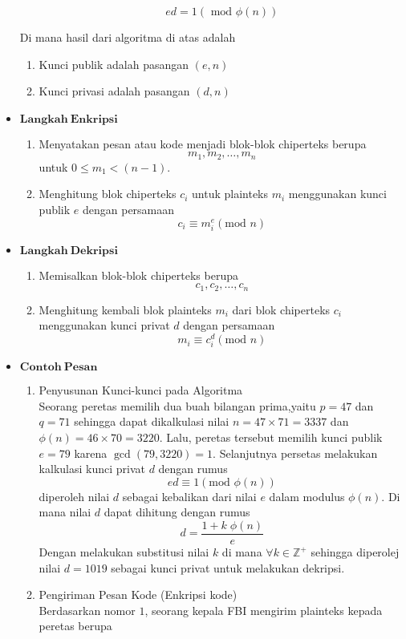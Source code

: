 \documentclass[12pt,A4paper]{article}
\begin{document}
\begin{itemize}
\begin{enumerate}
		\[ed = 1 \left(\text{ mod } \phi(n)\right) \]
	\end{enumerate}
	Di mana hasil dari algoritma di atas adalah
	\begin{enumerate}
		\item Kunci publik adalah pasangan $(e, n)$
		\item Kunci privasi adalah pasangan $(d, n)$
	\end{enumerate}
\newpage
	\item $\mathbf{Langkah \: Enkripsi}$
	\begin{enumerate}
		\item Menyatakan pesan atau kode menjadi blok-blok chiperteks berupa
		\[m_1, m_2, \dots , m_n\]
		untuk $0 \leq m_1 < (n-1)$.
		\item Menghitung blok chiperteks $c_i$ untuk plainteks $m_i$ menggunakan kunci publik $e$ dengan persamaan
		\[c_i \equiv m_i^e (\text{mod }n)\]
	\end{enumerate}
	\item $\mathbf{Langkah \: Dekripsi}$
	\begin{enumerate}
		\item Memisalkan blok-blok chiperteks berupa
		\[c_1,c_2, \dots, c_n\]
		\item Menghitung kembali blok plainteks $m_i$ dari blok chiperteks $c_i$ menggunakan kunci privat $d$ dengan persamaan
		\[m_i \equiv c_i^d (\text{mod } n)\]
	\end{enumerate}
	\item $\mathbf{Contoh \: Pesan}$
	\begin{enumerate}
	\item Penyusunan Kunci-kunci pada Algoritma
	\\ Seorang peretas memilih dua buah bilangan prima,yaitu $p = 47$ dan $q=71$ sehingga dapat dikalkulasi nilai $n = 47 \times 71 = 3337$ dan $\phi(n) = 46 \times 70 = 3220$. Lalu, peretas tersebut memilih kunci publik $e = 79$ karena $\gcd(79, 3220) = 1$. Selanjutnya persetas melakukan kalkulasi kunci privat $d$ dengan rumus
	\[ed \equiv 1 (\text{mod }\phi(n))\]
	diperoleh nilai $d$ sebagai kebalikan dari nilai $e$ dalam modulus $\phi(n)$. Di mana nilai $d$ dapat dihitung dengan rumus
	\[d = \frac{1 + k \; \phi(n)}{e}\]
	Dengan melakukan substitusi nilai $k$ di mana $\forall k \in \mathbb{Z^+}$ sehingga diperolej nilai $d = 1019$ sebagai kunci privat untuk melakukan dekripsi.
	\item Pengiriman Pesan Kode (Enkripsi kode)
	\\ Berdasarkan nomor $1$, seorang kepala FBI mengirim plainteks kepada peretas berupa

\end{enumerate}
\end{itemize}
\end{document}
